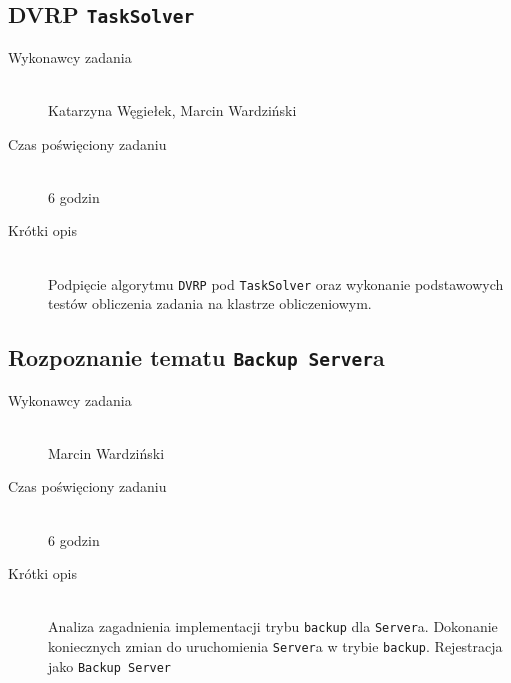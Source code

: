 \documentclass[a4paper]{article}
\begin{document}
\subsection{DVRP \texttt{TaskSolver}}
\begin{description}
    \item[Wykonawcy zadania] \hfill \\ Katarzyna Węgiełek, Marcin Wardziński
    \item[Czas poświęciony zadaniu] \hfill \\ 6 godzin
    \item[Krótki opis] \hfill \\ Podpięcie algorytmu \texttt{DVRP} pod \texttt{TaskSolver} oraz wykonanie podstawowych testów obliczenia zadania na klastrze obliczeniowym.
\end{description}
   
\subsection{Rozpoznanie tematu \texttt{Backup Server}a}
\begin{description}
    \item[Wykonawcy zadania] \hfill \\ Marcin Wardziński
    \item[Czas poświęciony zadaniu] \hfill \\ 6 godzin
    \item[Krótki opis] \hfill \\ Analiza zagadnienia implementacji trybu \texttt{backup} dla \texttt{Server}a. Dokonanie koniecznych zmian do uruchomienia \texttt{Server}a w trybie \texttt{backup}. Rejestracja jako \texttt{Backup Server}
\end{description}   
\end{document}
